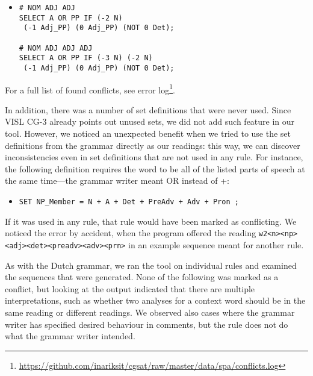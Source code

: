\begin{itemize}
\item[] 
\begin{verbatim}
# NOM ADJ ADJ
SELECT A OR PP IF (-2 N) 
 (-1 Adj_PP) (0 Adj_PP) (NOT 0 Det);

# NOM ADJ ADJ ADJ
SELECT A OR PP IF (-3 N) (-2 N) 
 (-1 Adj_PP) (0 Adj_PP) (NOT 0 Det);
\end{verbatim}
\end{itemize}


For a full list of found conflicts, see error log\footnote{\url{https://github.com/inariksit/cgsat/raw/master/data/spa/conflicts.log}}.

In addition, there was a number of set definitions that were never
used. Since VISL CG-3 already points out unused sets, we did not add such
feature in our tool. However, we noticed an unexpected benefit when
we tried to use the set definitions from the grammar directly as our
readings: this way, we can discover inconsistencies even in
set definitions that are not used in any rule.
For instance, the following definition requires the word to be all of
the listed parts of speech at the same time---the grammar writer meant
OR instead of +:
\begin{itemize}
\item[] 
\texttt{SET NP\_Member = N + A + Det + PreAdv + Adv + Pron ;}
\end{itemize}

If it was used in any rule, that rule would have been marked as
conflicting. We noticed the error by accident, when the program
offered the reading \texttt{w2<n><np><adj><det><preadv><adv><prn>}
in an example sequence meant for another rule.


As with the Dutch grammar, we ran the tool on individual rules and
examined the sequences that were generated. None of the following was
marked as a conflict, but looking at the output indicated that there
are multiple interpretations, such as whether two analyses for a
context word should be in the same reading or different readings.
We observed also cases where the grammar writer has specified desired
behaviour in comments, but the rule does not do what the grammar
writer intended. 


